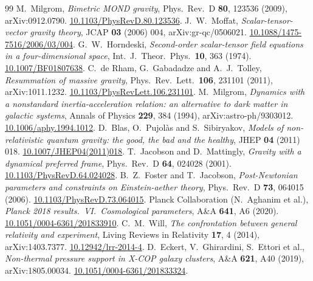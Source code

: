 \documentclass[11pt,letterpaper]{article}
\begin{document}
\begin{thebibliography}{99}
 M.\ Milgrom, \emph{Bimetric MOND gravity}, Phys.\ Rev.\ D \textbf{80}, 123536 (2009), arXiv:0912.0790. \href{https://doi.org/10.1103/PhysRevD.80.123536}{10.1103/PhysRevD.80.123536}.
 J.\ W.\ Moffat, \emph{Scalar-tensor-vector gravity theory}, JCAP \textbf{03} (2006) 004, arXiv:gr-qc/0506021. \href{https://doi.org/10.1088/1475-7516/2006/03/004}{10.1088/1475-7516/2006/03/004}.
 G.\ W.\ Horndeski, \emph{Second-order scalar-tensor field equations in a four-dimensional space}, Int.\ J.\ Theor.\ Phys.\ \textbf{10}, 363 (1974). \href{https://doi.org/10.1007/BF01807638}{10.1007/BF01807638}.
 C.\ de Rham, G.\ Gabadadze and A.\ J.\ Tolley, \emph{Resummation of massive gravity}, Phys.\ Rev.\ Lett.\ \textbf{106}, 231101 (2011), arXiv:1011.1232. \href{https://doi.org/10.1103/PhysRevLett.106.231101}{10.1103/PhysRevLett.106.231101}.
 M.\ Milgrom, \emph{Dynamics with a nonstandard inertia-acceleration relation: an alternative to dark matter in galactic systems}, Annals of Physics \textbf{229}, 384 (1994), arXiv:astro-ph/9303012. \href{https://doi.org/10.1006/aphy.1994.1012}{10.1006/aphy.1994.1012}.
 D.\ Blas, O.\ Pujol\`as and S.\ Sibiryakov, \emph{Models of non-relativistic quantum gravity: the good, the bad and the healthy}, JHEP \textbf{04} (2011) 018. \href{https://doi.org/10.1007/JHEP04(2011)018}{10.1007/JHEP04(2011)018}.
 T.\ Jacobson and D.\ Mattingly, \emph{Gravity with a dynamical preferred frame}, Phys.\ Rev.\ D \textbf{64}, 024028 (2001). \href{https://doi.org/10.1103/PhysRevD.64.024028}{10.1103/PhysRevD.64.024028}.
 B.\ Z.\ Foster and T.\ Jacobson, \emph{Post-Newtonian parameters and constraints on Einstein-aether theory}, Phys.\ Rev.\ D \textbf{73}, 064015 (2006). \href{https://doi.org/10.1103/PhysRevD.73.064015}{10.1103/PhysRevD.73.064015}.
 Planck Collaboration (N.\ Aghanim et al.), \emph{Planck 2018 results.\ VI.\ Cosmological parameters}, A\&A \textbf{641}, A6 (2020). \href{https://doi.org/10.1051/0004-6361/201833910}{10.1051/0004-6361/201833910}.
 C.\ M.\ Will, \emph{The confrontation between general relativity and experiment}, Living Reviews in Relativity \textbf{17}, 4 (2014), arXiv:1403.7377. \href{https://doi.org/10.12942/lrr-2014-4}{10.12942/lrr-2014-4}.
 D.\ Eckert, V.\ Ghirardini, S.\ Ettori et al., \emph{Non-thermal pressure support in X-COP galaxy clusters}, A\&A \textbf{621}, A40 (2019), arXiv:1805.00034. \href{https://doi.org/10.1051/0004-6361/201833324}{10.1051/0004-6361/201833324}.

\end{thebibliography}
\end{document}
